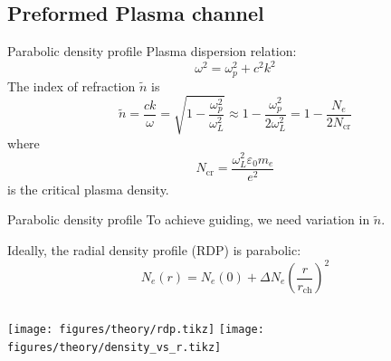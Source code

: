 \documentclass[dvipsnames]{beamer}
\begin{document}
\subsection{Preformed Plasma channel}
\begin{frame}{Parabolic density profile}
 Plasma dispersion relation:
 \begin{equation*}
\omega^2=\omega_p^2+c^2k^2
 \end{equation*}
 The index of refraction $\tilde n$ is
 \begin{equation*}
\tilde{n}=\frac{c k}{\omega}=\sqrt{1-\frac{\omega_p^2}{\omega_L^2}}\approx1-\frac{\omega_p^2}{2\omega_L^2}=1-\frac{N_e}{2N_\text{cr}}
 \end{equation*}
 {\small where
\begin{equation*}
 N_\text{cr}=\frac{\omega_L^2\varepsilon_0 m_e}{e^2}
\end{equation*}
is the critical plasma density.}
\end{frame}
\begin{frame}{Parabolic density profile}
 To achieve guiding, we need variation in $\tilde{n}$.

 Ideally, the radial density profile (RDP) is parabolic:
\begin{equation*}
N_e(r)=N_e(0)+\Delta N_e\left( \frac{r}{r_\text{ch}}\right)^2
 \end{equation*}
 \begin{columns}
\texttt{[image: figures/theory/rdp.tikz]}
\texttt{[image: figures/theory/density\_vs\_r.tikz]}
 \end{columns}
\end{frame}
\end{document}
